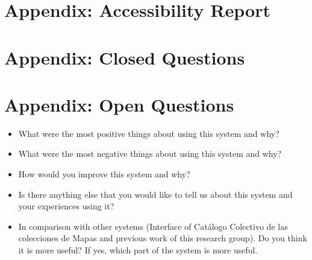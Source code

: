 \documentclass[11pt]{report}
\begin{document}
\listoffigures
\listoftables 


\newpage
\appendix
\chapter{Appendix: Accessibility Report}
\label{app:access}



\chapter{Appendix: Closed Questions}
\label{app:closed}



\chapter{Appendix: Open Questions}
\label{app:open}

\begin{itemize}
	\item What were the most positive things about using this system and why?
	\item What were the most negative things about using this system and why?
	\item How would you improve this system and why?
	\item Is there anything else that you would like to tell us about this system and your experiences using it?
	\item In comparison with other systems (Interface of Catálogo Colectivo de las colecciones de Mapas and previous work of this research group).
Do you think it is more useful? If yes, which part of the system is more useful.
\end{itemize}
\end{document}
